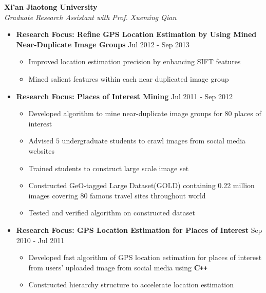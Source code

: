 \documentclass[10pt]{article}
\newenvironment{outerlist}[1][\enskip\textbullet]%
        {\begin{itemize}[#1,leftmargin=*]}{\end{itemize}%
         \vspace{-1.2\baselineskip}}
\newenvironment{innerlist}[1][\enskip\textbullet]%
        {\begin{itemize}[#1,leftmargin=*,parsep=0pt,itemsep=0pt,topsep=0pt,partopsep=0pt]}
        {\end{itemize}}
\begin{document}
\textbf{Xi'an Jiaotong University } \\
\emph{Graduate Research Assistant with Prof. Xueming Qian}
\begin{outerlist}
\vspace{-.1in}

        \item[] \textbf{Research Focus: Refine GPS Location Estimation by Using Mined Near-Duplicate Image Groups}  \hfill {Jul 2012 - Sep 2013}
        \begin{innerlist}
\vspace{-.05in} 
        \item Improved location estimation precision by enhancing SIFT features
        \item Mined salient features within each near duplicated image group 
        \end{innerlist}

        \item[] \textbf{Research Focus: Places of Interest Mining} \hfill {Jul 2011 - Sep 2012}
        \begin{innerlist}
\vspace{-.05in}
        \item Developed algorithm to mine near-duplicate image groups for 80 places of interest
	\item Advised $5$ undergraduate students to crawl images from social media websites
	\item Trained students to construct large scale image set 
        \item Constructed GeO-tagged Large Dataset(GOLD) containing 0.22 million images covering 80 famous travel sites throughout world
        \item Tested and verified algorithm  on constructed dataset 
        \end{innerlist}

        
        \item[] \textbf{Research Focus: GPS Location Estimation for Places of Interest}  \hfill {Sep 2010 - Jul 2011}
        \begin{innerlist}
\vspace{-.05in}
        \item Developed fast algorithm of GPS location estimation for places of interest from users' uploaded image from social media using \textbf{C\texttt{++}}
        \item Constructed hierarchy structure to accelerate location estimation
        \end{innerlist}
        
\vspace{.2in}
\end{outerlist}
\end{document}
